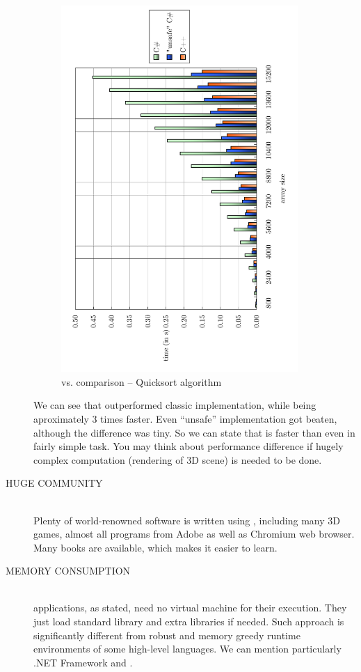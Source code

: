 \begin{description}
\begin{figure}[ht]
\centering\includegraphics[width=9cm,angle=-90]{graphics/laboratory/00-langcomparison.pdf}
\caption{\cpp{} vs. \csharp{} comparison -- Quicksort algorithm}\label{figure:comparison}
\end{figure}

We can see that \cpp{} outperformed classic \csharp{} implementation, while being aproximately 3 times faster. Even \enquote{unsafe} \csharp{} implementation got beaten, although the difference was tiny. So we can state that \cpp{} is faster than \csharp{} even in fairly simple task. You may think about performance difference if hugely complex computation (\eg rendering of 3D scene) is needed to be done.

\item[HUGE COMMUNITY\ts{\textcolor{YellowOrange}{great}}]\hfill \\
Plenty of world-renowned software is written using \cpp{}, including many 3D games, almost all programs from Adobe as well as Chromium web browser. Many \cpp{} books are available, which makes it easier to learn.

\vfill

\item[MEMORY CONSUMPTION\ts{\textcolor{ultragreen}{good}}]\hfill \\
\cpp{} applications, as stated, need no virtual machine for their execution. They just load standard \cpp{} library and extra libraries if needed. Such approach is significantly different from robust and memory greedy runtime environments of some high-level languages. We can mention particularly .NET Framework and .


\end{description}
